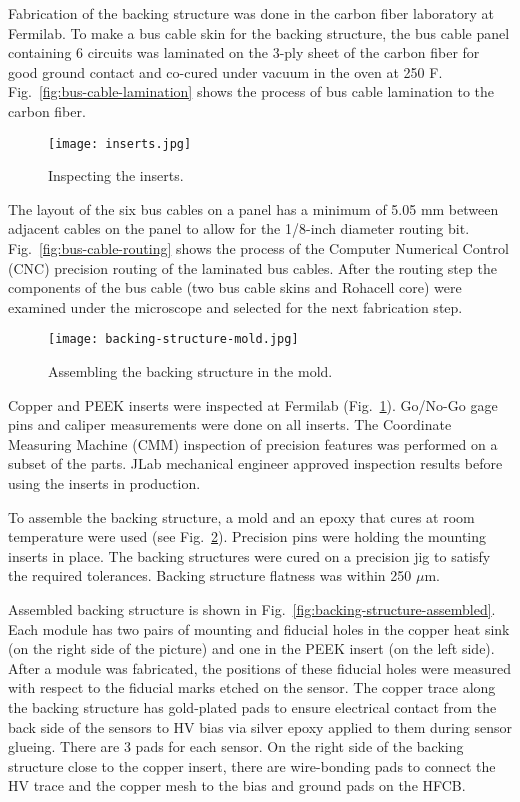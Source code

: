 Fabrication of the backing structure was done in the carbon fiber laboratory at Fermilab. To make a bus cable skin for the backing structure, the bus cable panel containing 6 circuits was laminated on the 3-ply sheet of the carbon fiber for good ground contact and co-cured under vacuum in the oven at 250 F. Fig.~\ref{fig:bus-cable-lamination} shows the process of bus cable lamination to the carbon fiber.

\begin{figure}[hbt] 
\centering 
\texttt{[image: inserts.jpg]}
\caption{Inspecting the inserts.}
\label{fig:inserts}
\end{figure}

The layout of the six bus cables on a panel has a minimum of 5.05 mm between adjacent cables on the panel to allow for the 1/8-inch diameter routing bit. Fig.~\ref{fig:bus-cable-routing} shows the process of the Computer Numerical Control (CNC) precision routing of the laminated bus cables. After the routing step the components of the bus cable (two bus cable skins and Rohacell core) were examined under the microscope and selected for the next fabrication step. 

\begin{figure}[hbt] 
\centering 
\texttt{[image: backing-structure-mold.jpg]}
\caption{Assembling the backing structure in the mold.}
\label{fig:backing-structure-mold}
\end{figure}

Copper and PEEK inserts were inspected at Fermilab (Fig.~\ref{fig:inserts}). Go/No-Go gage pins and caliper measurements were done on all inserts. The Coordinate Measuring Machine (CMM) inspection of precision features was performed on a subset of the parts. JLab mechanical engineer approved inspection results before using the inserts in production.

To assemble the backing structure, a mold and an epoxy that cures at room temperature were used (see Fig.~\ref{fig:backing-structure-mold}). Precision pins were holding the  mounting inserts in place. The backing structures were cured on a precision jig to satisfy the required tolerances. Backing structure flatness was within 250 $\mu$m.

Assembled backing structure is shown in Fig.~\ref{fig:backing-structure-assembled}. Each module has two pairs of mounting and fiducial holes in the copper heat sink (on the right side of the picture) and one in the PEEK insert (on the left side). After a module was fabricated, the positions of these fiducial holes were measured with respect to the fiducial marks etched on the sensor. The copper trace along the backing structure has gold-plated pads to ensure electrical contact from the back side of the sensors to HV bias via silver epoxy applied to them during sensor glueing. There are 3 pads for each sensor. On the right side of the backing structure close to the copper insert, there are wire-bonding pads to connect the HV trace and the copper mesh to the bias and ground pads on the HFCB.

